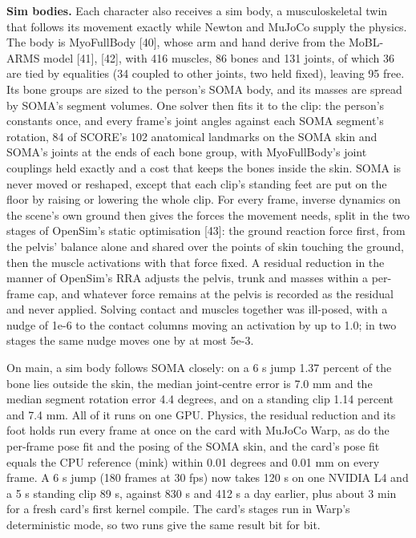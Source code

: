 \documentclass[
  11pt,
]{article}
\begin{document}
\textbf{Sim bodies.} Each character also receives a sim body, a
musculoskeletal twin that follows its movement exactly while Newton and
MuJoCo supply the physics. The body is MyoFullBody {[}40{]}, whose arm
and hand derive from the MoBL-ARMS model {[}41{]}, {[}42{]}, with 416
muscles, 86 bones and 131 joints, of which 36 are tied by equalities (34
coupled to other joints, two held fixed), leaving 95 free. Its bone
groups are sized to the person's SOMA body, and its masses are spread by
SOMA's segment volumes. One solver then fits it to the clip: the
person's constants once, and every frame's joint angles against each
SOMA segment's rotation, 84 of SCORE's 102 anatomical landmarks on the
SOMA skin and SOMA's joints at the ends of each bone group, with
MyoFullBody's joint couplings held exactly and a cost that keeps the
bones inside the skin. SOMA is never moved or reshaped, except that each
clip's standing feet are put on the floor by raising or lowering the
whole clip. For every frame, inverse dynamics on the scene's own ground
then gives the forces the movement needs, split in the two stages of
OpenSim's static optimisation {[}43{]}: the ground reaction force first,
from the pelvis' balance alone and shared over the points of skin
touching the ground, then the muscle activations with that force fixed.
A residual reduction in the manner of OpenSim's RRA adjusts the pelvis,
trunk and masses within a per-frame cap, and whatever force remains at
the pelvis is recorded as the residual and never applied. Solving
contact and muscles together was ill-posed, with a nudge of 1e-6 to the
contact columns moving an activation by up to 1.0; in two stages the
same nudge moves one by at most 5e-3.

On main, a sim body follows SOMA closely: on a 6 s jump 1.37 percent of
the bone lies outside the skin, the median joint-centre error is 7.0 mm
and the median segment rotation error 4.4 degrees, and on a standing
clip 1.14 percent and 7.4 mm. All of it runs on one GPU. Physics, the
residual reduction and its foot holds run every frame at once on the
card with MuJoCo Warp, as do the per-frame pose fit and the posing of
the SOMA skin, and the card's pose fit equals the CPU reference (mink)
within 0.01 degrees and 0.01 mm on every frame. A 6 s jump (180 frames
at 30 fps) now takes 120 s on one NVIDIA L4 and a 5 s standing clip 89
s, against 830 s and 412 s a day earlier, plus about 3 min for a fresh
card's first kernel compile. The card's stages run in Warp's
deterministic mode, so two runs give the same result bit for bit.
\end{document}

